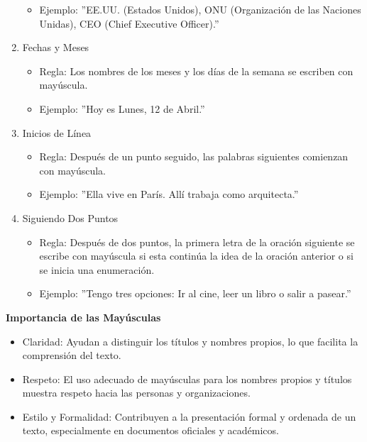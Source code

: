 \begin{enumerate}
\begin{itemize}
                  \item Ejemplo: ''EE.UU. (Estados Unidos), ONU (Organización de las Naciones Unidas), CEO (Chief Executive Officer).''
            \end{itemize}
      \item Fechas y Meses
            \begin{itemize}
                  \item Regla: Los nombres de los meses y los días de la semana se escriben con mayúscula.
                  \item Ejemplo: ''Hoy es Lunes, 12 de Abril.''
            \end{itemize}
      \item Inicios de Línea
            \begin{itemize}
                  \item Regla: Después de un punto seguido, las palabras siguientes comienzan con mayúscula.
                  \item Ejemplo: ''Ella vive en París. Allí trabaja como arquitecta.''
            \end{itemize}
      \item Siguiendo Dos Puntos
            \begin{itemize}
                  \item Regla: Después de dos puntos, la primera letra de la oración siguiente se escribe con mayúscula si esta continúa la idea de la oración anterior o si se inicia una enumeración.
                  \item Ejemplo: ''Tengo tres opciones: Ir al cine, leer un libro o salir a pasear.''
            \end{itemize}
\end{enumerate}

\textbf{Importancia de las Mayúsculas}

\begin{itemize}
      \item Claridad: Ayudan a distinguir los títulos y nombres propios, lo que facilita la comprensión del texto.
      \item Respeto: El uso adecuado de mayúsculas para los nombres propios y títulos muestra respeto hacia las personas y organizaciones.
      \item Estilo y Formalidad: Contribuyen a la presentación formal y ordenada de un texto, especialmente en documentos oficiales y académicos.
\end{itemize}

